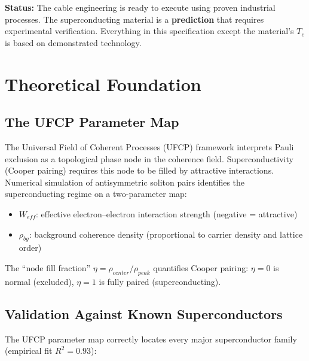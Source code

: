 \documentclass[11pt, a4paper]{article}
\begin{document}
\textcolor{nm-red}{\textbf{Status:}} The cable engineering is
ready to execute using proven industrial processes. The
superconducting material is a \textbf{prediction} that requires
experimental verification. Everything in this specification except
the material's $T_c$ is based on demonstrated technology.

\tableofcontents

\section{Theoretical Foundation}
\label{sec:theory}

\subsection{The UFCP Parameter Map}

The Universal Field of Coherent Processes (UFCP) framework
interprets Pauli exclusion as a topological phase node in the
coherence field. Superconductivity (Cooper pairing) requires this
node to be filled by attractive interactions. Numerical simulation
of antisymmetric soliton pairs identifies the superconducting regime
on a two-parameter map:

\begin{itemize}[nosep]
  \item $W_{eff}$: effective electron--electron interaction strength
        (negative = attractive)
  \item $\rho_{bg}$: background coherence density (proportional to
        carrier density and lattice order)
\end{itemize}

The ``node fill fraction'' $\eta = \rho_{center}/\rho_{peak}$
quantifies Cooper pairing: $\eta = 0$ is normal (excluded),
$\eta = 1$ is fully paired (superconducting).

\subsection{Validation Against Known Superconductors}

The UFCP parameter map correctly locates every major superconductor
family (empirical fit $R^2 = 0.93$):
\end{document}
